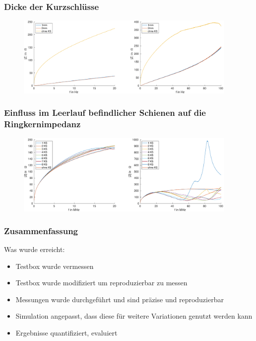 \documentclass[accentcolor=tud9b, colorbacktitle, inverttitle]{tudbeamer}
\begin{document}



\begin{frame}\frametitle{Dicke der Kurzschlüsse}
\vspace{-1em}
\begin{figure}[h]
	\centering
	\includegraphics[width=0.95\textwidth]{Z_RK_thick_1KS}
\end{figure}
\end{frame}



\begin{frame}\frametitle{Einfluss im Leerlauf befindlicher Schienen auf die Ringkernimpedanz}
\vspace{-1em}
\begin{figure}[h]
	\centering
	\includegraphics[width=0.95\textwidth]{Z_RK_numKS_open}
\end{figure}
\end{frame}

\begin{frame}\frametitle{Zusammenfassung}
Was wurde erreicht:
\begin{itemize}
	\item Testbox wurde vermessen
	\item Testbox wurde modifiziert um reproduzierbar zu messen
	\item Messungen wurde durchgef\"uhrt und sind pr\"azise und reproduzierbar
	\item Simulation angepasst, dass diese für weitere Variationen genutzt werden kann
	\item Ergebnisse quantifiziert, evaluiert
\end{itemize}
\end{frame}
\end{document}

